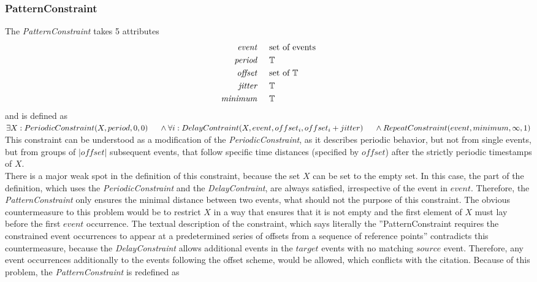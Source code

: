 		
	\subsubsection{PatternConstraint}
		The \emph{PatternConstraint} takes 5 attributes
		\begin{align*}
			\emph{event} 	& \hspace{.5cm}\text{set of events}\\
			\emph{period} 	& \hspace{.5cm}\mathbb{T}\\
			\emph{offset}	& \hspace{.5cm} \text{set of }\mathbb{T}\\
			\emph{jitter}	& \hspace{.5cm}\mathbb{T}\\
			\emph{minimum}	& \hspace{.5cm}\mathbb{T}
		\end{align*}
		and is defined as \\[10pt]
		\begin{math}
			\exists X: PeriodicConstraint(X, period, 0, 0)\\
			\text{\hspace{.5cm}} \land \forall i: DelayContraint(X, event, offset_i, offset_i+jitter)\\
			\text{\hspace{.5cm}} \land RepeatConstraint(event, minimum, \infty, 1)
		\end{math}\\[10pt]
		This constraint can be understood as a modification of the \emph{PeriodicConstraint}, as it describes periodic behavior, but not from single events, but from groups of $|offset|$ subsequent events, that follow specific time distances (specified by $offset$) after the strictly periodic timestamps of $X$.\\
		There is a major weak spot in the definition of this constraint, because the set $X$ can be set to the empty set. In this case, the part of the definition, which uses the \emph{PeriodicConstraint} and the \emph{DelayContraint}, are always satisfied, irrespective of the event in $event$. Therefore, the \emph{PatternConstraint} only ensures the minimal distance between two events, what should not the purpose of this constraint. 
		The obvious countermeasure to this problem would be to restrict $X$ in a way that ensures that it is not empty and the first element of $X$ must lay before the first $event$ occurrence. The textual description of the constraint, which says literally the ''PatternConstraint requires the constrained event occurrences to appear at a predetermined series of offsets from a sequence of reference points'' contradicts this countermeasure, because the \emph{DelayConstraint} allows additional events in the $target$ events with no matching $source$ event. Therefore, any event occurrences additionally to the events following the offset scheme, would be allowed, which conflicts with the citation. Because of this problem, the \emph{PatternConstraint} is redefined as \\[10pt]
